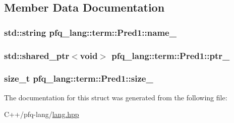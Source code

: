 \subsection{Member Data Documentation}
\hypertarget{structpfq__lang_1_1term_1_1Pred1_a2e8fa633d20f23a5bda4f1d1d2d7c40a}{
\subsubsection[{name\-\_\-}]{\setlength{\rightskip}{0pt plus 5cm}std\-::string pfq\-\_\-lang\-::term\-::\-Pred1\-::name\-\_\-}}\label{structpfq__lang_1_1term_1_1Pred1_a2e8fa633d20f23a5bda4f1d1d2d7c40a}
\hypertarget{structpfq__lang_1_1term_1_1Pred1_aab8272102e260db367460682dc3f51c5}{
\subsubsection[{ptr\-\_\-}]{\setlength{\rightskip}{0pt plus 5cm}std\-::shared\-\_\-ptr$<$void$>$ pfq\-\_\-lang\-::term\-::\-Pred1\-::ptr\-\_\-}}\label{structpfq__lang_1_1term_1_1Pred1_aab8272102e260db367460682dc3f51c5}
\hypertarget{structpfq__lang_1_1term_1_1Pred1_a00e31cd95cdaeed41806c33a487072f8}{
\subsubsection[{size\-\_\-}]{\setlength{\rightskip}{0pt plus 5cm}size\-\_\-t pfq\-\_\-lang\-::term\-::\-Pred1\-::size\-\_\-}}\label{structpfq__lang_1_1term_1_1Pred1_a00e31cd95cdaeed41806c33a487072f8}


The documentation for this struct was generated from the following file\-:\begin{DoxyCompactItemize}
\item 
C++/pfq-\/lang/\hyperlink{lang_8hpp}{lang.\-hpp}\end{DoxyCompactItemize}
